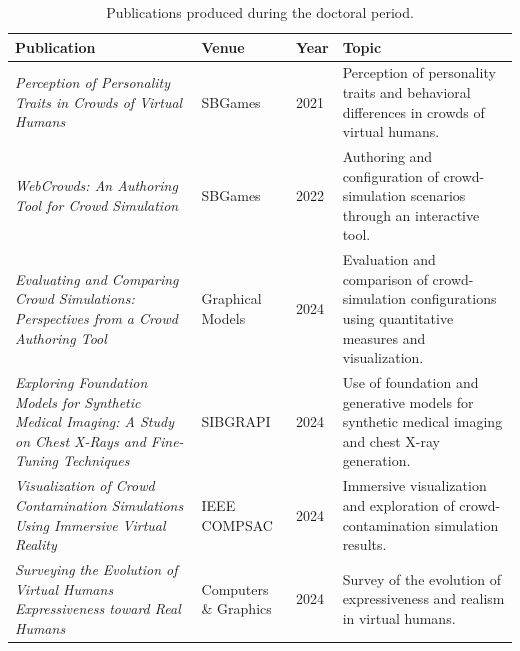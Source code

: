 \begin{table}[ht]
    \centering
    \footnotesize
    \setlength{\tabcolsep}{4pt}
    \caption{Publications produced during the doctoral period.}
    \label{tbl:thesis_publications}
    \begin{tabularx}{\linewidth}{@{}p{4.9cm}p{2.6cm}p{0.8cm}X@{}}
        \toprule
        \textbf{Publication} &
        \textbf{Venue} &
        \textbf{Year} &
        \textbf{Topic} \\
        \midrule

        \textit{Perception of Personality Traits in Crowds of Virtual Humans}~\cite{nardino2021perception}
        & SBGames
        & 2021
        & Perception of personality traits and behavioral differences in crowds of virtual humans. \\

        \textit{WebCrowds: An Authoring Tool for Crowd Simulation}~\cite{silva2022webcrowds}
        & SBGames
        & 2022
        & Authoring and configuration of crowd-simulation scenarios through an interactive tool. \\

        \textit{Evaluating and Comparing Crowd Simulations: Perspectives from a Crowd Authoring Tool}~\cite{silva2024evaluating}
        & Graphical Models
        & 2024
        & Evaluation and comparison of crowd-simulation configurations using quantitative measures and visualization. \\

        \textit{Exploring Foundation Models for Synthetic Medical Imaging: A Study on Chest X-Rays and Fine-Tuning Techniques}~\cite{dasilva2024foundation}
        & SIBGRAPI
        & 2024
        & Use of foundation and generative models for synthetic medical imaging and chest X-ray generation. \\

        \textit{Visualization of Crowd Contamination Simulations Using Immersive Virtual Reality}~\cite{teixeira2024visualization}
        & IEEE COMPSAC
        & 2024
        & Immersive visualization and exploration of crowd-contamination simulation results. \\

        \textit{Surveying the Evolution of Virtual Humans Expressiveness toward Real Humans}~\cite{knob2024surveying}
        & Computers \& Graphics
        & 2024
        & Survey of the evolution of expressiveness and realism in virtual humans. \\


\end{tabularx}
\end{table}
